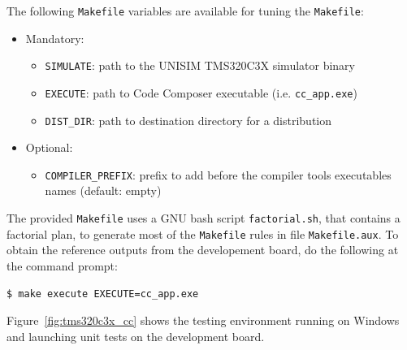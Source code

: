 \noindent The following \texttt{Makefile} variables are available for tuning the \texttt{Makefile}:
\begin{itemize}
\item Mandatory:
	\begin{itemize}
	\item \texttt{SIMULATE}: path to the UNISIM TMS320C3X simulator binary
	\item \texttt{EXECUTE}: path to Code Composer executable (i.e. \texttt{cc\_app.exe})
	\item \texttt{DIST\_DIR}: path to destination directory for a distribution
	\end{itemize}
\item Optional:
	\begin{itemize}
	\item \texttt{COMPILER\_PREFIX}: prefix to add before the compiler tools executables names (default: empty)
	\end{itemize}
\end{itemize}

The provided \texttt{Makefile} uses a GNU bash script \texttt{factorial.sh}, that contains a factorial plan, to generate most of the \texttt{Makefile} rules in file \texttt{Makefile.aux}.
To obtain the reference outputs from the developement board, do the following at the command prompt:
\begin{verbatim}
$ make execute EXECUTE=cc_app.exe
\end{verbatim}

Figure~\ref{fig:tms320c3x_cc} shows the testing environment running on Windows and launching unit tests on the development board.

